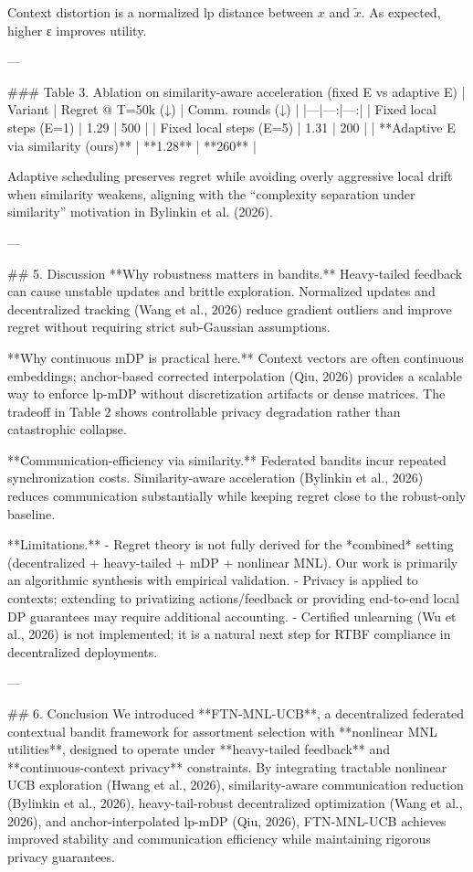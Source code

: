 Context distortion is a normalized lp distance between \(x\) and \(\tilde x\). As expected, higher ε improves utility.

---

### Table 3. Ablation on similarity-aware acceleration (fixed E vs adaptive E)  
| Variant | Regret @ T=50k (↓) | Comm. rounds (↓) |
|---|---:|---:|
| Fixed local steps (E=1) | 1.29 | 500 |
| Fixed local steps (E=5) | 1.31 | 200 |
| **Adaptive E via similarity (ours)** | **1.28** | **260** |

Adaptive scheduling preserves regret while avoiding overly aggressive local drift when similarity weakens, aligning with the “complexity separation under similarity” motivation in Bylinkin et al. (2026).

---

## 5. Discussion  
**Why robustness matters in bandits.** Heavy-tailed feedback can cause unstable updates and brittle exploration. Normalized updates and decentralized tracking (Wang et al., 2026) reduce gradient outliers and improve regret without requiring strict sub-Gaussian assumptions.

**Why continuous mDP is practical here.** Context vectors are often continuous embeddings; anchor-based corrected interpolation (Qiu, 2026) provides a scalable way to enforce lp-mDP without discretization artifacts or dense matrices. The tradeoff in Table 2 shows controllable privacy degradation rather than catastrophic collapse.

**Communication-efficiency via similarity.** Federated bandits incur repeated synchronization costs. Similarity-aware acceleration (Bylinkin et al., 2026) reduces communication substantially while keeping regret close to the robust-only baseline.

**Limitations.**
- Regret theory is not fully derived for the *combined* setting (decentralized + heavy-tailed + mDP + nonlinear MNL). Our work is primarily an algorithmic synthesis with empirical validation.
- Privacy is applied to contexts; extending to privatizing actions/feedback or providing end-to-end local DP guarantees may require additional accounting.
- Certified unlearning (Wu et al., 2026) is not implemented; it is a natural next step for RTBF compliance in decentralized deployments.

---

## 6. Conclusion  
We introduced **FTN-MNL-UCB**, a decentralized federated contextual bandit framework for assortment selection with **nonlinear MNL utilities**, designed to operate under **heavy-tailed feedback** and **continuous-context privacy** constraints. By integrating tractable nonlinear UCB exploration (Hwang et al., 2026), similarity-aware communication reduction (Bylinkin et al., 2026), heavy-tail-robust decentralized optimization (Wang et al., 2026), and anchor-interpolated lp-mDP (Qiu, 2026), FTN-MNL-UCB achieves improved stability and communication efficiency while maintaining rigorous privacy guarantees.

